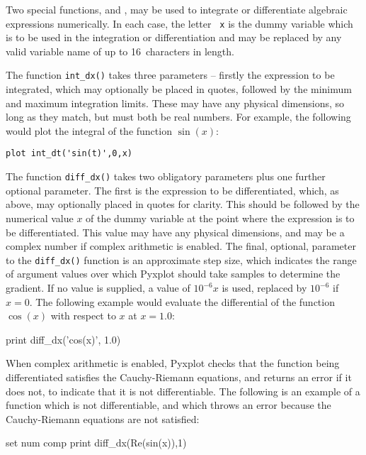  Two special functions,
 and , may be used to integrate or
differentiate algebraic expressions numerically.  In each case, the letter {\tt
x} is the dummy variable which is to be used in the integration or
differentiation and may be replaced by any valid variable name of up to
16~characters in length.

The function {\tt int\_dx()} takes three parameters -- firstly the expression
to be integrated, which may optionally be placed in quotes, followed by the
minimum and maximum integration limits. These may have any physical dimensions,
so long as they match, but must both be real numbers. For example, the
following would plot the integral of the function $\sin(x)$:

\begin{verbatim}
plot int_dt('sin(t)',0,x)
\end{verbatim}

The function {\tt diff\_dx()} takes two obligatory parameters plus one further
optional parameter. The first is the expression to be differentiated, which,
as above, may optionally placed in quotes for clarity. This should be followed
by the numerical value $x$ of the dummy variable at the point where the
expression is to be differentiated. This value may have any physical
dimensions, and may be a complex number if complex arithmetic is enabled. The
final, optional, parameter to the {\tt diff\_dx()} function is an approximate
step size, which indicates the range of argument values over which Pyxplot
should take samples to determine the gradient. If no value is supplied, a value
of $10^{-6}x$ is used, replaced by $10^{-6}$ if $x=0$.  The following example
would evaluate the differential of the function $\cos(x)$ with respect to $x$
at $x=1.0$:

\begin{dodo}
print diff\_dx('cos(x)', 1.0)
\end{dodo}

When complex arithmetic is enabled, Pyxplot checks that the function being
differentiated satisfies the Cauchy-Riemann equations, and returns an error if
it does not, to indicate that it is not differentiable.  The following is an
example of a function which is not differentiable, and which throws an error
because the Cauchy-Riemann equations are not satisfied:

\begin{dontdo}
set num comp\newline
print diff\_dx(Re(sin(x)),1)
\end{dontdo}

